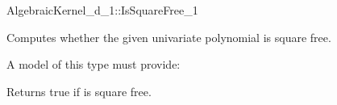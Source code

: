 \begin{ccRefFunctionObjectConcept}{AlgebraicKernel_d_1::IsSquareFree_1}

\ccDefinition
Computes whether the given univariate polynomial is square free. 
 
\ccRefines 
{}

\ccTypes
\ccGlue
{}

A model of this type must provide:

\ccOperations
{}

{Returns true if  is square free.}

\ccSeeAlso
{}\\
\\

\end{ccRefFunctionObjectConcept} 


